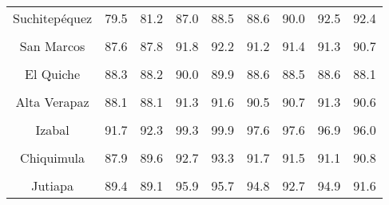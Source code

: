 \begin{tabular}[t]{ccccccccc}
Suchitepéquez & 79.5 & 81.2 & 87.0 & 88.5 & 88.6 & 90.0 & 92.5 & 92.4\\
\cellcolor[HTML]{B6B3FF}{Retalhuleu} & \cellcolor[HTML]{B6B3FF}{88.3} & \cellcolor[HTML]{B6B3FF}{86.5} & \cellcolor[HTML]{B6B3FF}{95.1} & \cellcolor[HTML]{B6B3FF}{94.4} & \cellcolor[HTML]{B6B3FF}{93.8} & \cellcolor[HTML]{B6B3FF}{91.6} & \cellcolor[HTML]{B6B3FF}{93.7} & \cellcolor[HTML]{B6B3FF}{91.3}\\
San Marcos & 87.6 & 87.8 & 91.8 & 92.2 & 91.2 & 91.4 & 91.3 & 90.7\\
\cellcolor[HTML]{B6B3FF}{Huehuetenango} & \cellcolor[HTML]{B6B3FF}{86.8} & \cellcolor[HTML]{B6B3FF}{85.7} & \cellcolor[HTML]{B6B3FF}{88.1} & \cellcolor[HTML]{B6B3FF}{86.3} & \cellcolor[HTML]{B6B3FF}{87.2} & \cellcolor[HTML]{B6B3FF}{84.5} & \cellcolor[HTML]{B6B3FF}{86.5} & \cellcolor[HTML]{B6B3FF}{83.1}\\
El Quiche & 88.3 & 88.2 & 90.0 & 89.9 & 88.6 & 88.5 & 88.6 & 88.1\\
\cellcolor[HTML]{B6B3FF}{Baja Verapaz} & \cellcolor[HTML]{B6B3FF}{84.8} & \cellcolor[HTML]{B6B3FF}{85.4} & \cellcolor[HTML]{B6B3FF}{89.0} & \cellcolor[HTML]{B6B3FF}{89.7} & \cellcolor[HTML]{B6B3FF}{85.6} & \cellcolor[HTML]{B6B3FF}{86.6} & \cellcolor[HTML]{B6B3FF}{85.6} & \cellcolor[HTML]{B6B3FF}{86.2}\\
Alta Verapaz & 88.1 & 88.1 & 91.3 & 91.6 & 90.5 & 90.7 & 91.3 & 90.6\\
\cellcolor[HTML]{B6B3FF}{Petén} & \cellcolor[HTML]{B6B3FF}{89.8} & \cellcolor[HTML]{B6B3FF}{89.7} & \cellcolor[HTML]{B6B3FF}{99.5} & \cellcolor[HTML]{B6B3FF}{99.1} & \cellcolor[HTML]{B6B3FF}{95.7} & \cellcolor[HTML]{B6B3FF}{95.2} & \cellcolor[HTML]{B6B3FF}{93.0} & \cellcolor[HTML]{B6B3FF}{91.6}\\
Izabal & 91.7 & 92.3 & 99.3 & 99.9 & 97.6 & 97.6 & 96.9 & 96.0\\
\cellcolor[HTML]{B6B3FF}{Zacapa} & \cellcolor[HTML]{B6B3FF}{86.8} & \cellcolor[HTML]{B6B3FF}{90.0} & \cellcolor[HTML]{B6B3FF}{92.7} & \cellcolor[HTML]{B6B3FF}{96.6} & \cellcolor[HTML]{B6B3FF}{91.6} & \cellcolor[HTML]{B6B3FF}{94.0} & \cellcolor[HTML]{B6B3FF}{91.2} & \cellcolor[HTML]{B6B3FF}{93.3}\\
Chiquimula & 87.9 & 89.6 & 92.7 & 93.3 & 91.7 & 91.5 & 91.1 & 90.8\\
\cellcolor[HTML]{B6B3FF}{Jalapa} & \cellcolor[HTML]{B6B3FF}{84.8} & \cellcolor[HTML]{B6B3FF}{85.3} & \cellcolor[HTML]{B6B3FF}{89.5} & \cellcolor[HTML]{B6B3FF}{89.7} & \cellcolor[HTML]{B6B3FF}{88.5} & \cellcolor[HTML]{B6B3FF}{88.7} & \cellcolor[HTML]{B6B3FF}{89.8} & \cellcolor[HTML]{B6B3FF}{88.7}\\
Jutiapa & 89.4 & 89.1 & 95.9 & 95.7 & 94.8 & 92.7 & 94.9 & 91.6\\
\bottomrule
\end{tabular}
